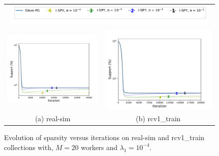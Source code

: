 \begin{figure}[h]
\begin{tabular}{cc}
\multicolumn{2}{c}{\vspace{-4pt}\includegraphics[width = 0.96\textwidth]{SODA/Figs/legend.pdf}}\\
\includegraphics[width = 0.5\linewidth]{SODA/Figs/real-sim_20w_00001_0001_density.pdf} & %
\includegraphics[width = 0.5\linewidth]{SODA/Figs/rcv_20w_00001_0001_density.pdf}\\%
(a) real-sim & (b) rcv1\_train
\end{tabular}
\caption{Evolution of sparsity versus iterations on real-sim and rcv1\_train collections with, $M=20$ workers and $\lambda_1= 10^{-4}.$}
    \label{fig:real_diff_sp}
\end{figure}
